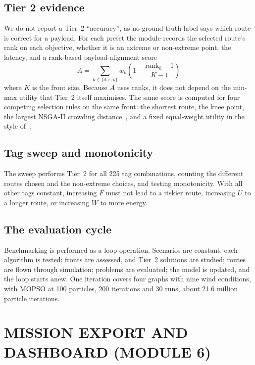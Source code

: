 \subsection{Tier 2 evidence}

We do not report a Tier~2 ``accuracy'', as no ground-truth label says which route is correct for a payload. For each preset the module records the
selected route's rank on each objective, whether it is an extreme or non-extreme point,
the latency, and a rank-based payload-alignment score
\begin{equation}
  A = \sum_{k \in \{d, \varepsilon, \rho\}} w_k\left(1 - \frac{\mathrm{rank}_k - 1}{K - 1}\right)
\end{equation}
where $K$ is the front size. Because $A$ uses ranks, it does not depend on the min-max
utility that Tier~2 itself maximises. The same score is computed for four competing
selection rules on the same front: the shortest route, the knee point, the largest NSGA-II
crowding distance~\cite{r8,r3}, and a fixed equal-weight utility in the style
of~\cite{r1}.

\subsection{Tag sweep and monotonicity}

The sweep performs Tier~2 for all 225 tag combinations, counting the different routes chosen and the non-extreme choices, and testing monotonicity. With all other tags constant, increasing $F$ must not lead to a riskier route, increasing $U$ to a longer route, or increasing $W$ to more energy.

\subsection{The evaluation cycle}

Benchmarking is performed as a loop operation. Scenarios are constant; each algorithm is
tested; fronts are assessed, and Tier~2 solutions are studied; routes are flown through
simulation; problems are evaluated; the model is updated, and the loop starts anew. One iteration covers four graphs with nine wind conditions, with MOPSO at 100 particles, 200 iterations and 30 runs, about 21.6 million particle iterations.

\section{MISSION EXPORT AND DASHBOARD (MODULE 6)}\label{sec:m6}

